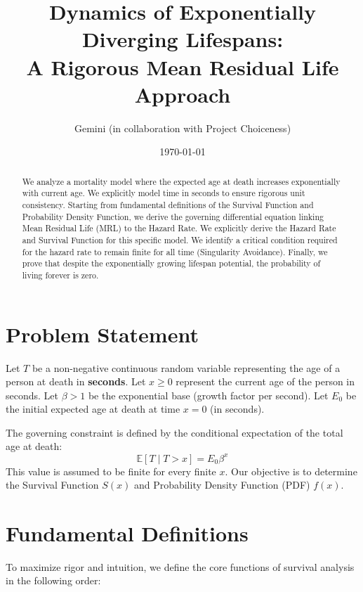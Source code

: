\documentclass{article}
\title{\textbf{Dynamics of Exponentially Diverging Lifespans: \\ A Rigorous Mean Residual Life Approach}}
\author{Gemini (in collaboration with Project Choiceness)}
\date{\today}
\begin{document}
	
	\maketitle
	
	\begin{abstract}
		We analyze a mortality model where the expected age at death increases exponentially with current age. We explicitly model time in seconds to ensure rigorous unit consistency. Starting from fundamental definitions of the Survival Function and Probability Density Function, we derive the governing differential equation linking Mean Residual Life (MRL) to the Hazard Rate. We explicitly derive the Hazard Rate and Survival Function for this specific model. We identify a critical condition required for the hazard rate to remain finite for all time (Singularity Avoidance). Finally, we prove that despite the exponentially growing lifespan potential, the probability of living forever is zero.
	\end{abstract}
	
	\section{Problem Statement}
	
	Let $T$ be a non-negative continuous random variable representing the age of a person at death in \textbf{seconds}.
	Let $x \ge 0$ represent the current age of the person in seconds.
	Let $\beta > 1$ be the exponential base (growth factor per second).
	Let $E_0$ be the initial expected age at death at time $x=0$ (in seconds).
	
	The governing constraint is defined by the conditional expectation of the total age at death:
	\begin{equation}
		\mathbb{E}[T \mid T > x] = E_0 \beta^x
	\end{equation}
	This value is assumed to be finite for every finite $x$. Our objective is to determine the Survival Function $S(x)$ and Probability Density Function (PDF) $f(x)$.
	
	\section{Fundamental Definitions}
	
	To maximize rigor and intuition, we define the core functions of survival analysis in the following order:
	
\end{document}
